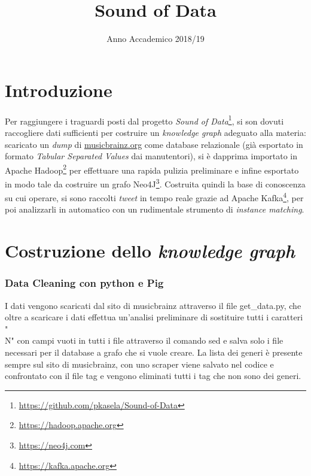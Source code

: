 \documentclass[12pt, a4paper, twocolumn]{article} %
\title{Sound of Data} %
\author{
  \authorstyle{
    Riccardo Cervero \hspace{25pt} 000000 \\  %
    Marco Ferrario \hspace{44pt}  000000 \\   %
    Pranav Kasela \hspace{46.5pt} 000000 \\   %
    Federico Moiraghi \hspace{21pt} 799735    %
  } %
  \newline\newline
  \institution{Università degli Studi di Milano Bicocca}
}
\date{Anno Accademico 2018/19} %
\begin{document}
\maketitle %

\thispagestyle{firstpage} %


\hfill
\newpage

\tableofcontents
\hfill
\newpage

\part{Introduzione}
Per raggiungere i traguardi posti dal progetto \textit{Sound of Data}\footnote{\url{https://github.com/pkasela/Sound-of-Data}}, si son dovuti raccogliere dati sufficienti per costruire un \textit{knowledge graph} adeguato alla materia: scaricato un \textit{dump} di \url{musicbrainz.org} come database relazionale (già esportato in formato \textit{Tabular Separated Values} dai manutentori), si è dapprima importato in Apache Hadoop\footnote{\url{https://hadoop.apache.org}} per effettuare una rapida pulizia preliminare e infine esportato in modo tale da costruire un grafo Neo4J\footnote{\url{https://neo4j.com}}.
Costruita quindi la base di conoscenza su cui operare, si sono raccolti \textit{tweet} in tempo reale grazie ad Apache Kafka\footnote{\url{https://kafka.apache.org}}, per poi analizzarli in automatico con un rudimentale strumento di \textit{instance matching}.

\hfill
\newpage
\part{Costruzione dello \textit{knowledge graph}}

\section{Data Cleaning con python e Pig}
I dati vengono scaricati dal sito di musicbrainz attraverso il file get\_data.py, che oltre a scaricare i dati effettua un'analisi preliminare di sostituire tutti i caratteri "\\N" con campi vuoti in tutti i file attraverso il comando sed e salva solo i file necessari per il database a grafo che si vuole creare. 
La lista dei generi è presente sempre sul sito di musicbrainz, con uno scraper viene salvato nel codice e confrontato con il file tag e vengono eliminati tutti i tag che non sono dei generi.
\end{document}
